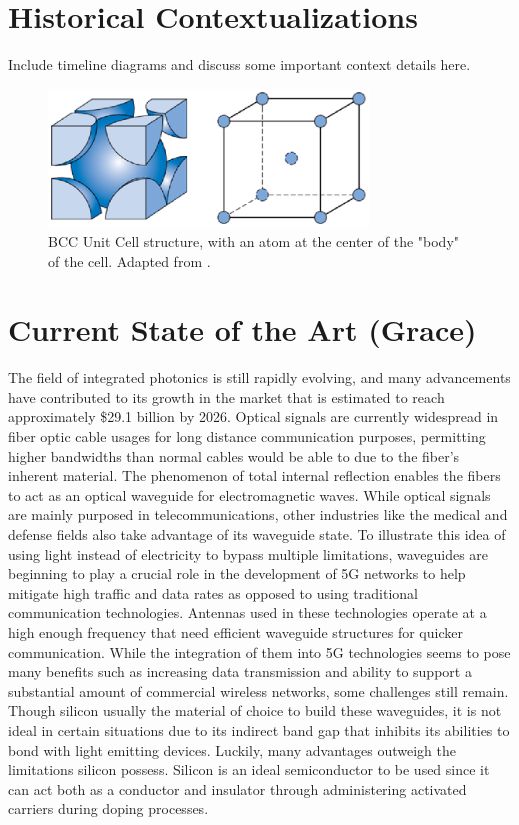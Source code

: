 \documentclass[10pt]{article}
\begin{document}
\section{Historical Contextualizations}

Include timeline diagrams and discuss some important context details here.


\begin{figure}[h]
    \centering
    \includegraphics[width=8.5cm]{fig1.eps}
    \caption{\label{tab1}BCC Unit Cell structure, with an atom at the center of the "body" of the cell. Adapted from \cite{ref01}.} 
    \end{figure}

\section{Current State of the Art (Grace)}
The field of integrated photonics is still rapidly evolving, and many advancements have contributed to its growth in the market that is estimated to reach approximately \$29.1 billion by 2026. Optical signals are currently widespread in fiber optic cable usages for long distance communication purposes, permitting higher bandwidths than normal cables would be able to due to the fiber’s inherent material. The phenomenon of total internal reflection enables the fibers to act as an optical waveguide for electromagnetic waves. While optical signals are mainly purposed in telecommunications, other industries like the medical and defense fields also take advantage of its waveguide state. To illustrate this idea of using light instead of electricity to bypass multiple limitations, waveguides are beginning to play a crucial role in the development of 5G networks to help mitigate high traffic and data rates as opposed to using traditional communication technologies. Antennas used in these technologies operate at a high enough frequency that need efficient waveguide structures for quicker communication. While the integration of them into 5G technologies seems to pose many benefits such as increasing data transmission and ability to support a substantial amount of commercial wireless networks, some challenges still remain. Though silicon usually the material of choice to build these waveguides, it is not ideal in certain situations due to its indirect band gap that inhibits its abilities to bond with light emitting devices. Luckily, many advantages outweigh the limitations silicon possess. Silicon is an ideal semiconductor to be used since it can act both as a conductor and insulator through administering activated carriers during doping processes.
\end{document}

